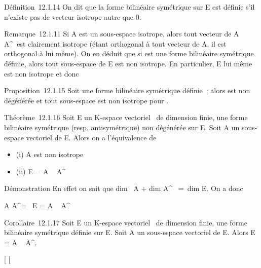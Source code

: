 \documentclass[]{article}
\begin{document}
Définition~12.1.14 On dit que la forme bilinéaire symétrique \phi sur E est
définie s'il n'existe pas de vecteur isotrope autre que 0.

Remarque~12.1.11 Si A est un sous-espace isotrope, alors tout vecteur de
A \bigcap A^\bot\diagdown\0\ est clairement
isotrope (étant orthogonal à tout vecteur de A, il est orthogonal à lui
même). On en déduit que si \phi est une forme bilinéaire symétrique
définie, alors tout sous-espace de E est non isotrope. En particulier, E
lui même est non isotrope et donc

Proposition~12.1.15 Soit \phi une forme bilinéaire symétrique définie~;
alors \phi est non dégénérée et tout sous-espace est non isotrope pour \phi.

Théorème~12.1.16 Soit E un K-espace vectoriel ~de dimension finie, \phi une
forme bilinéaire symétrique (resp. antisymétrique) non dégénérée sur E.
Soit A un sous-espace vectoriel de E. Alors on a l'équivalence de

\begin{itemize}
\itemsep1pt\parskip0pt
\item
  (i) A est non isotrope
\item
  (ii) E = A \oplus~ A^\bot
\end{itemize}

Démonstration En effet on sait que dim~ A
+ dim A^\bot~ =\
dim E. On a donc

A \bigcap A^\bot = \0\
\Leftrightarrow E = A \oplus~ A^\bot

Corollaire~12.1.17 Soit E un K-espace vectoriel ~de dimension finie, \phi
une forme bilinéaire symétrique définie sur E. Soit A un sous-espace
vectoriel de E. Alors E = A \oplus~ A^\bot.

{[}
{[}
\end{document}
